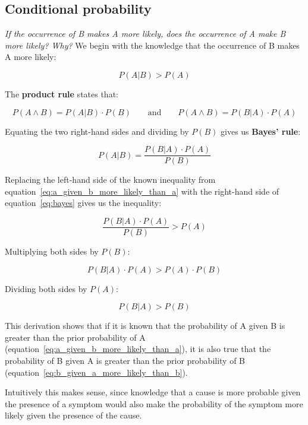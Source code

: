 \subsection{Conditional probability}

\textit{If the occurrence of B makes A more likely, does the occurrence of A make B more likely? Why?}\vspace{0.1cm}
We begin with the knowledge that the occurrence of B makes A more likely:

\begin{equation}
\label{eq:a_given_b_more_likely_than_a}
P(A \vert B) > P(A)
\end{equation}

The \textbf{product rule} states that:

\begin{equation}
P(A \land B) = P(A \vert B) \cdot P(B)
\qquad\text{and}\qquad
P(A \land B) = P(B \vert A) \cdot P(A)
\end{equation}

Equating the two right-hand sides and dividing by $P(B)$ gives us \textbf{Bayes' rule}:

\begin{equation}
\label{eq:bayes}
P(A \vert B) = \frac{P(B \vert A) \cdot P(A)}{P(B)}
\end{equation}

Replacing the left-hand side of the known inequality from equation~\ref{eq:a_given_b_more_likely_than_a} with the right-hand side of equation~\ref{eq:bayes} gives us the inequality:

\begin{equation}
\frac{P(B \vert A) \cdot P(A)}{P(B)} > P(A)
\end{equation}

Multiplying both sides by $P(B)$:

\begin{equation}
P(B \vert A) \cdot P(A) > P(A) \cdot P(B)
\end{equation}

Dividing both sides by $P(A)$:

\begin{equation}
\label{eq:b_given_a_more_likely_than_b}
P(B \vert A) > P(B)
\end{equation}

This derivation shows that if it is known that the probability of A given B is greater than the prior probability of A (equation~\ref{eq:a_given_b_more_likely_than_a}), it is also true that the probability of B given A is greater than the prior probability of B (equation~\ref{eq:b_given_a_more_likely_than_b}).

Intuitively this makes sense, since knowledge that a cause is more probable given the presence of a symptom would also make the probability of the symptom more likely given the presence of the cause.



